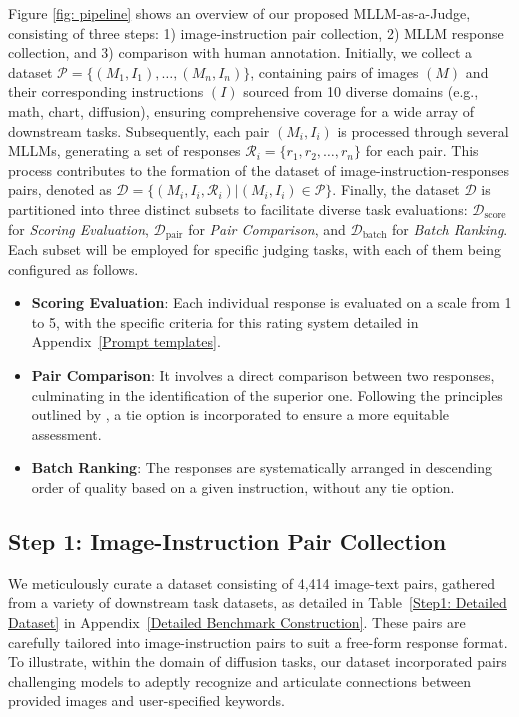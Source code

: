 Figure \ref{fig: pipeline} shows an overview of our proposed MLLM-as-a-Judge, consisting of three steps: 1) image-instruction pair collection, 2) MLLM response collection, and 3) comparison with human annotation.
Initially, we collect a dataset $\mathcal{P} = \{(M_1, I_1), \ldots, (M_n, I_n)\}$, containing pairs of images $(M)$ and their corresponding instructions $(I)$ sourced from 10 diverse domains (e.g., math, chart, diffusion), ensuring comprehensive coverage for a wide array of downstream tasks.
Subsequently, each pair $(M_i, I_i)$ is processed through several MLLMs, 
generating a set of responses $\mathcal{R}_i = \{r_1, r_2, \ldots, r_n\}$ for each pair. This process contributes to the formation of the dataset of image-instruction-responses pairs, denoted as $\mathcal{D} = \{(M_i, I_i, \mathcal{R}_i) | (M_i, I_i) \in \mathcal{P}\}$.
Finally, the dataset $\mathcal{D}$ is partitioned into three distinct subsets to facilitate diverse task evaluations: $\mathcal{D}_{\text{score}}$ for \textit{Scoring Evaluation}, $\mathcal{D}_{\text{pair}}$ for \textit{Pair Comparison}, and $\mathcal{D}_{\text{batch}}$ for \textit{Batch Ranking}.
Each subset will be employed for specific judging tasks, with each of them being configured as follows.
\begin{itemize}[nolistsep, leftmargin=*]
\item \textbf{Scoring Evaluation}: Each individual response is evaluated on a scale from 1 to 5, with the specific criteria for this rating system detailed in Appendix~\ref{Prompt templates}.
\item \textbf{Pair Comparison}: It involves a direct comparison between two responses, 
culminating in the identification of the superior one. Following the principles outlined by \citep{deutsch2023ties}, a tie option is incorporated to ensure a more equitable assessment.
\item \textbf{Batch Ranking}: 
The responses are systematically arranged in descending order of quality based on a given instruction, without any tie option.
\end{itemize} 

\subsection{Step 1: Image-Instruction Pair Collection}
We meticulously curate a dataset consisting of 4,414 image-text pairs, gathered from a variety of downstream task datasets, as detailed in Table~\ref{Step1: Detailed Dataset} in Appendix~\ref{Detailed Benchmark Construction}. These pairs are carefully tailored into image-instruction pairs to suit a free-form response format. To illustrate, within the domain of diffusion tasks, our dataset incorporated pairs challenging models to adeptly recognize and articulate connections between provided images and user-specified keywords.


